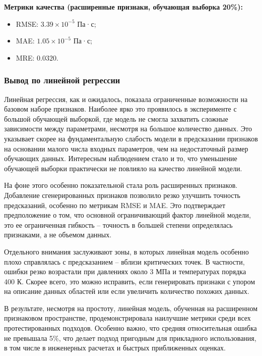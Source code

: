 \documentclass[a4paper,12pt]{article}
\begin{document}
    \begin{minipage}{\textwidth}
      \textbf{Метрики качества (расширенные признаки, обучающая выборка 20\%):}
      \begin{itemize}
          \item RMSE: \( 3.39 \times 10^{-5} \) Па·с;
          \item MAE: \( 1.05 \times 10^{-5} \) Па·с;
          \item MRE: \( 0.0320 \).
      \end{itemize}
    \end{minipage}

    \subsubsection{Вывод по линейной регрессии}

      Линейная регрессия, как и ожидалось, показала ограниченные возможности на базовом наборе признаков. Наиболее ярко это проявилось в эксперименте с большой обучающей выборкой, где модель не смогла захватить сложные зависимости между параметрами, несмотря на большое количество данных. Это указывает скорее на фундаментальную слабость модели в предсказании признаков на основании малого числа входных параметров, чем на недостаточный размер обучающих данных. Интересным наблюдением стало и то, что уменьшение обучающей выборки практически не повлияло на качество линейной модели.

      На фоне этого особенно показательной стала роль расширенных признаков. Добавление сгенерированных признаков позволило резко улучшить точность предсказаний, особенно по метрикам RMSE и MAE. Это подтверждает предположение о том, что основной ограничивающий фактор линейной модели, это ее ограниченная гибкость -- точность в большей степени определялась признаками, а не объемом данных.
      
      Отдельного внимания заслуживают зоны, в которых линейная модель особенно плохо справлялась с предсказанием -- вблизи критических точек. В частности, ошибки резко возрастали при давлениях около 3 МПа и температурах порядка 400 К. Скорее всего, это можно исправить, если генерировать признаки с упором на описание данных областей или если увеличить количество похожих данных.
      
      В результате, несмотря на простоту, линейная модель, обученная на расширенном признаковом пространстве, продемонстрировала наилучшие метрики среди всех протестированных подходов. Особенно важно, что средняя относительная ошибка не превышала 5\%, что делает подход пригодным для прикладного использования, в том числе в инженерных расчетах и быстрых приближенных оценках.
\end{document}

